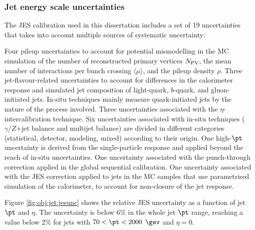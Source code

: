 \subsubsection{Jet energy scale uncertainties}
The JES calibration \cite{ATL-PHYS-PUB-2015-015} used in this dissertation includes a set of 19 uncertainties that takes into account multiple sources of systematic uncertainty:

\bi
\ib Four pileup uncertainties to account for potential mismodelling in the MC simulation of the number of reconstructed primary vertices $N_{\rm PV}$, the mean number of interactions per bunch crossing $\langle\mu\rangle$, and the pileup density $\rho$.
\ib Three jet-flavour-related uncertainties to account for differences in the calorimeter response and simulated jet composition of light-quark, $b$-quark, and gluon-initiated jets. In-situ techniques mainly measure quark-initiated jets by the nature of the process involved.
\ib Three uncertainties associated with the $\eta$-intercalibration technique. 
\ib Six uncertainties associated with in-situ techniques ($\gamma/Z$+jet balance and multijet balance) are divided in different categories (statistical, detector, modeling, mixed) according to their origin.
\ib One high-$\pt$ uncertainty is derived from the single-particle response and applied beyond the reach of in-situ uncertainties.
\ib One uncertainty associated with the punch-through correction applied in the global sequential calibration.
\ib One uncertainty associated with the JES correction applied to jets in the MC samples that use parametrised simulation of the calorimeter, to account for non-closure of the jet response.
\ei

Figure \ref{fig:obj:jet:jesunc} shows the relative JES uncertainty as a function of jet $\pt$ and $\eta$. The uncertainty is below $6\%$ in the whole jet $\pt$ range, reaching a value below 2\% for jets with $70<\pt<2000$ $\gev$ and $\eta=0$.


